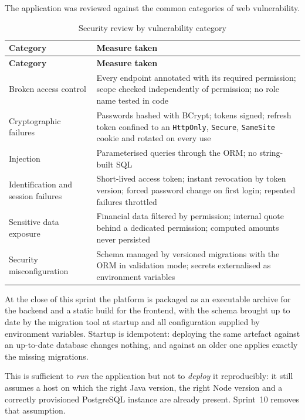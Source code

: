 The application was reviewed against the common categories of web vulnerability.

\begin{longtable}{|m{4.6cm}|m{10cm}|}
\caption{Security review by vulnerability category}\label{tab:owasp}\\
\hline
\textbf{Category} & \textbf{Measure taken} \\
\hline
\endfirsthead
\hline
\textbf{Category} & \textbf{Measure taken} \\
\hline
\endhead
\endfoot
\endlastfoot
\hline
Broken access control & Every endpoint annotated with its required permission; scope checked
independently of permission; no role name tested in code \\
\hline
Cryptographic failures & Passwords hashed with BCrypt; tokens signed; refresh token confined to an
\texttt{HttpOnly}, \texttt{Secure}, \texttt{SameSite} cookie and rotated on every use \\
\hline
Injection & Parameterised queries through the ORM; no string-built SQL \\
\hline
Identification and session failures & Short-lived access token; instant revocation by token version;
forced password change on first login; repeated failures throttled \\
\hline
Sensitive data exposure & Financial data filtered by permission; internal quote behind a dedicated
permission; computed amounts never persisted \\
\hline
Security misconfiguration & Schema managed by versioned migrations with the ORM in validation mode;
secrets externalised as environment variables \\
\hline
\end{longtable}

At the close of this sprint the platform is packaged as an executable archive for the backend and a
static build for the frontend, with the schema brought up to date by the migration tool at startup
and all configuration supplied by environment variables. Startup is idempotent: deploying the same
artefact against an up-to-date database changes nothing, and against an older one applies exactly
the missing migrations.

This is sufficient to \emph{run} the application but not to \emph{deploy} it reproducibly: it still
assumes a host on which the right Java version, the right Node version and a correctly provisioned
PostgreSQL instance are already present. Sprint~10 removes that assumption.


